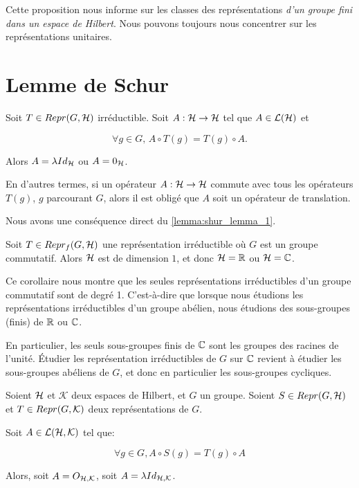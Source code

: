 Cette proposition nous informe sur les classes des représentations \textit{d'un groupe
fini dans un espace de Hilbert}. Nous pouvons toujours nous concentrer sur les
représentations unitaires.

\section{Lemme de Schur}

\begin{proposition} 
	\label{lemma:shur_lemma_1}
	Soit $T \in Repr(G, \mathcal{H})$ irréductible.
	Soit $A : \mathcal{H} \rightarrow \mathcal{H}$
	tel que $A \in \mathcal{L}(\mathcal{H})$ et

	\begin{equation}
		\forall g \in G, \, A \circ T(g) = T(g) \circ A.
	\end{equation}

	Alors $A = \lambda Id_{\mathcal{H}}$ ou $A = 0_{\mathcal{H}}$.

	En d'autres termes, si un opérateur $A : \mathcal{H} \rightarrow \mathcal{H}$
	commute avec tous les opérateurs $T(g)$, $g$ parcourant $G$, alors il est
	obligé que $A$ soit un opérateur de translation.
\end{proposition}

Nous avons une conséquence direct du \ref{lemma:shur_lemma_1}.

\begin{corollary}
	Soit $T \in Repr_{f}(G, \mathcal{H})$ une représentation irréductible où $G$
	est un groupe commutatif. Alors $\mathcal{H}$ est de dimension $1$, et donc
	$\mathcal{H} = \mathbb{R}$ ou $\mathcal{H} = \mathbb{C}$.
\end{corollary}

Ce corollaire nous montre que les seules représentations irréductibles d'un
groupe commutatif sont de degré 1. C'est-à-dire que lorsque nous étudions les
représentations irréductibles d'un groupe abélien, nous étudions des
sous-groupes (finis) de $\mathbb{R}$ ou $\mathbb{C}$.

En particulier, les seuls sous-groupes finis de $\mathbb{C}$ sont les groupes des
racines de l'unité. Étudier les représentation irréductibles de $G$ sur
$\mathbb{C}$ revient à étudier les sous-groupes abéliens de $G$, et donc en
particulier les sous-groupes cycliques.

\begin{proposition} 
	\label{lemma:shur_lemma_2}
	Soient $\mathcal{H}$ et $\mathcal{K}$ deux espaces de Hilbert, et $G$ un groupe.
	Soient $S \in Repr(G, \mathcal{H})$ et $T \in Repr(G, \mathcal{K})$ deux
	représentations de $G$.

	Soit $A \in \mathcal{L}(\mathcal{H}, \mathcal{K})$ tel que:

	\begin{equation*}
		\forall g \in G, A \circ S(g) = T(g) \circ A
	\end{equation*}

	Alors, soit $A = O_{\mathcal{H}, \mathcal{K}}$, soit $A = \lambda Id_{\mathcal{H},
		\mathcal{K}}$.
\end{proposition}

